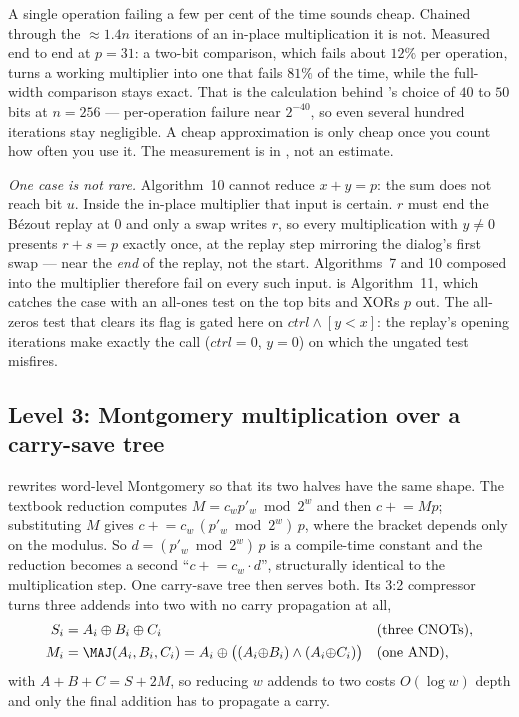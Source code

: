 \begin{warnbox}[title={Failure compounds, which is why the paper's budget is so large}]
A single operation failing a few per cent of the time sounds cheap. Chained through the
$\approx1.4n$ iterations of an in-place multiplication it is not. Measured end to end at $p=31$: a
two-bit comparison, which fails about $12\%$ per operation, turns a working multiplier into one that
fails $81\%$ of the time, while the full-width comparison stays exact. That is the calculation behind \cite{ec:schrott26}'s choice of $40$ to $50$
bits at $n=256$ --- per-operation failure near $2^{-40}$, so even several hundred iterations stay
negligible. A cheap approximation is only cheap once you count how often you use it. The measurement
is in , not an estimate.
\end{warnbox}

\emph{One case is not rare.} Algorithm~10 cannot reduce $x+y=p$: the sum does not reach bit $u$.
Inside the in-place multiplier that input is certain. $r$ must end the B\'ezout replay at $0$ and
only a swap writes $r$, so every multiplication with $y\neq0$ presents $r+s=p$ exactly once, at the
replay step mirroring the dialog's first swap --- near the \emph{end} of the replay, not the start.
Algorithms~7 and 10 composed into the multiplier therefore fail on every such input.
 is Algorithm~11, which catches the case with an all-ones test on
the top bits and XORs $p$ out. The all-zeros test that clears its flag is gated here on
$\mathit{ctrl}\wedge[y<x]$: the replay's opening iterations make exactly the call
($\mathit{ctrl}=0$, $y=0$) on which the ungated test misfires.

\subsection{Level 3: Montgomery multiplication over a carry-save tree}\label{ec:sec:mont}

\cite{ec:kim26} rewrites word-level Montgomery so that its two halves have the same shape. The
textbook reduction computes $M=c_w p'_w \bmod 2^w$ and then $c \mathrel{+}= Mp$; substituting $M$
gives $c \mathrel{+}= c_w\,(p'_w \bmod 2^w)\,p$, where the bracket depends only on the modulus. So
$d=(p'_w\bmod 2^w)\,p$ is a compile-time constant and the reduction becomes a second
``$c \mathrel{+}= c_w\cdot d$'', structurally identical to the multiplication step. One carry-save
tree then serves both. Its 3:2 compressor turns three addends into two with no carry propagation at
all,
\[
\begin{aligned}
S_i &= A_i \oplus B_i \oplus C_i && (\text{three CNOTs}),\\
M_i &= \MAJ(A_i,B_i,C_i) = A_i \oplus \big((A_i{\oplus}B_i)\wedge(A_i{\oplus}C_i)\big) && (\text{one AND}),
\end{aligned}
\]
with $A+B+C=S+2M$, so reducing $w$ addends to two costs $O(\log w)$ depth and only the final
addition has to propagate a carry.


